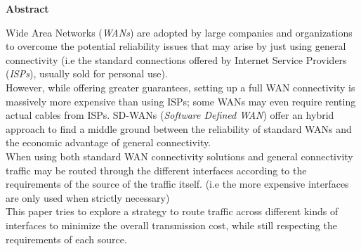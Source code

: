 \pagebreak
\thispagestyle{empty}
\hspace{0pt}
\vfill
\textbf{Abstract} \\
\vspace{0.2cm}
\begin{flushleft}
	Wide Area Networks (\textit{WANs})  are adopted by large companies and organizations to overcome the potential reliability issues that may arise by just using general connectivity (i.e the standard connections offered by Internet Service Providers (\textit{ISPs}), usually sold for personal use). \\
	However, while offering greater guarantees, setting up a full WAN connectivity is massively more expensive than using ISPs; some WANs may even require renting actual cables from ISPs.
	SD-WANs (\textit{Software Defined WAN}) offer an hybrid approach to find a middle ground between the reliability of standard WANs and the economic advantage of general connectivity. \\
	When using both standard WAN connectivity solutions and general connectivity traffic may be routed through the different interfaces according to the requirements of the source of the traffic itself. (i.e the more expensive interfaces are only used when strictly necessary) \\
	This paper tries to explore a strategy to route traffic across different kinds of interfaces to minimize the overall transmission cost, while still respecting the requirements of each source.
\end{flushleft}
\vfill
\hspace{0pt}
\pagebreak